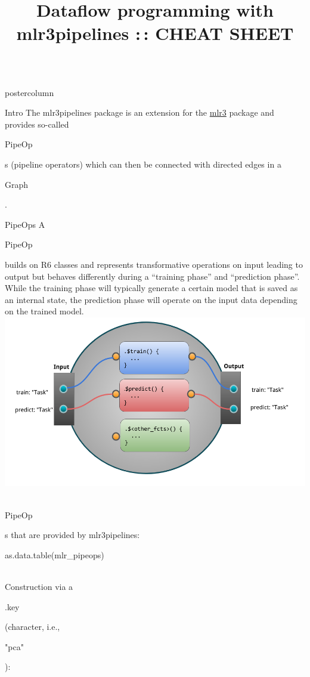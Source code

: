 \documentclass{beamer}
\title{Dataflow programming with mlr3pipelines :\,: CHEAT SHEET} %
\newlength{\columnheight} %
\newcommand{\codeinline}[1]{\begin{codeboxinline}#1\end{codeboxinline}}
\begin{document}
\begin{frame}[fragile]{}
	\begin{columns}
		\begin{column}{.245\textwidth}
			\begin{beamercolorbox}[center]{postercolumn}
				\begin{minipage}{.98\textwidth}
					\parbox[t][\columnheight]{\textwidth}{
						\begin{myblock}{Intro}
              The mlr3pipelines package is an extension for the \href{https://github.com/mlr-org/mlr3}{mlr3} package and provides so-called \codeinline{PipeOp}s (pipeline operators) which can then be connected with directed edges in a \codeinline{Graph}.
            \end{myblock}
						\begin{myblock}{PipeOps}
              A \codeinline{PipeOp} builds on R6 classes and represents transformative operations on input leading to output but behaves differently during a ``training phase'' and ``prediction phase''. While the training phase will typically generate a certain model that is saved as an internal state, the prediction phase will operate on the input data depending on the trained model.
              \ \\
              \includegraphics[width=\textwidth]{img/po_viz.png}
              \ \\
              \codeinline{PipeOp}s that are provided by mlr3pipelines:
              \begin{codebox}
                as.data.table(mlr\_pipeops)
              \end{codebox}
              \ \\
              Construction via a \codeinline{.key} (character, i.e., \codeinline{"pca"}):
              \begin{codebox}

\end{codebox}
\end{myblock}}
\end{minipage}
\end{beamercolorbox}
\end{column}
\end{columns}
\end{frame}
\end{document}
